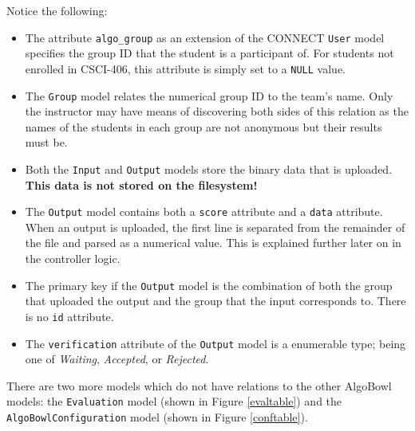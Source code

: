 \documentclass[12pt]{article}
\begin{document}
Notice the following:

\begin{itemize}
    \item The attribute \texttt{algo\_group} as an extension of the CONNECT
        \texttt{User} model specifies the group ID that the student is a
        participant of.  For students not enrolled in CSCI-406, this attribute
        is simply set to a \texttt{NULL} value.
    \item The \texttt{Group} model relates the numerical group ID to the team's
        name. Only the instructor may have means of discovering both sides of
        this relation as the names of the students in each group are not
        anonymous but their results must be.
    \item Both the \texttt{Input} and \texttt{Output} models store the binary
        data that is uploaded. \textbf{This data is not stored on the
        filesystem!}
    \item The \texttt{Output} model contains both a \texttt{score} attribute
        and a \texttt{data} attribute. When an output is uploaded, the first
        line is separated from the remainder of the file and parsed as a
        numerical value. This is explained further later on in the controller
        logic.
    \item The primary key if the \texttt{Output} model is the combination of
        both the group that uploaded the output and the group that the input
        corresponds to. There is no \texttt{id} attribute.
    \item The \texttt{verification} attribute of the \texttt{Output} model is a
        enumerable type; being one of \emph{Waiting}, \emph{Accepted}, or
        \emph{Rejected}.
\end{itemize}

There are two more models which do not have relations to the other AlgoBowl
models: the \texttt{Evaluation} model (shown in Figure \ref{evaltable}) and the
\texttt{AlgoBowlConfiguration} model (shown in Figure \ref{conftable}).
\end{document}
